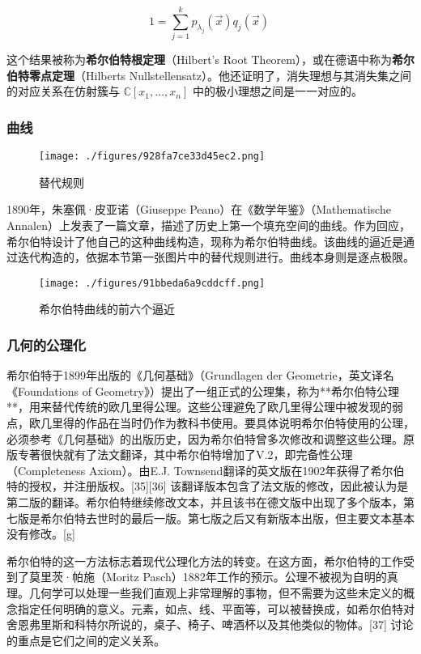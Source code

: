 \[
1 = \sum_{j=1}^{k} p_{\lambda_j}(\vec{x}) q_j(\vec{x})~
\]

这个结果被称为\textbf{希尔伯特根定理}（Hilbert's Root Theorem），或在德语中称为\textbf{希尔伯特零点定理}（Hilberts Nullstellensatz）。他还证明了，消失理想与其消失集之间的对应关系在仿射簇与 \( \mathbb{C}[x_1, \dots, x_n] \) 中的极小理想之间是一一对应的。
\subsubsection{曲线}
\begin{figure}[ht]
\centering
\texttt{[image: ./figures/928fa7ce33d45ec2.png]}
\caption{替代规则} \label{fig_David_9}
\end{figure}
1890年，朱塞佩·皮亚诺（Giuseppe Peano）在《数学年鉴》（Mathematische Annalen）上发表了一篇文章，描述了历史上第一个填充空间的曲线。作为回应，希尔伯特设计了他自己的这种曲线构造，现称为希尔伯特曲线。该曲线的逼近是通过迭代构造的，依据本节第一张图片中的替代规则进行。曲线本身则是逐点极限。
\begin{figure}[ht]
\centering
\texttt{[image: ./figures/91bbeda6a9cddcff.png]}
\caption{希尔伯特曲线的前六个逼近} \label{fig_David_10}
\end{figure}
\subsubsection{几何的公理化}
希尔伯特于1899年出版的《几何基础》（Grundlagen der Geometrie，英文译名《Foundations of Geometry》）提出了一组正式的公理集，称为**希尔伯特公理**，用来替代传统的欧几里得公理。这些公理避免了欧几里得公理中被发现的弱点，欧几里得的作品在当时仍作为教科书使用。要具体说明希尔伯特使用的公理，必须参考《几何基础》的出版历史，因为希尔伯特曾多次修改和调整这些公理。原版专著很快就有了法文翻译，其中希尔伯特增加了V.2，即完备性公理（Completeness Axiom）。由E.J. Townsend翻译的英文版在1902年获得了希尔伯特的授权，并注册版权。[35][36] 该翻译版本包含了法文版的修改，因此被认为是第二版的翻译。希尔伯特继续修改文本，并且该书在德文版中出现了多个版本，第七版是希尔伯特去世时的最后一版。第七版之后又有新版本出版，但主要文本基本没有修改。[g]

希尔伯特的这一方法标志着现代公理化方法的转变。在这方面，希尔伯特的工作受到了莫里茨·帕施（Moritz Pasch）1882年工作的预示。公理不被视为自明的真理。几何学可以处理一些我们直观上非常理解的事物，但不需要为这些未定义的概念指定任何明确的意义。元素，如点、线、平面等，可以被替换成，如希尔伯特对舍恩弗里斯和科特尔所说的，桌子、椅子、啤酒杯以及其他类似的物体。[37] 讨论的重点是它们之间的定义关系。

